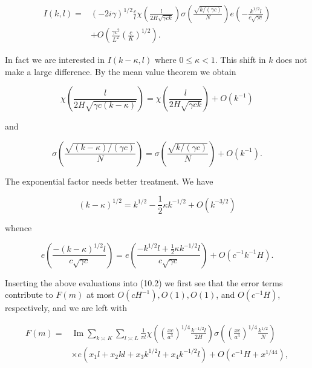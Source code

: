 \documentclass[10pt]{article}
\begin{document}
$$
\begin{aligned}
I(k,l)={}&(-2i\gamma)^{1/2}\frac{c}{l}
\chi\left(\frac{l}{2H\sqrt{\gamma ck}}\right)
\sigma\left(\frac{\sqrt{k/(\gamma c)}}{N}\right)
 e\left(-\frac{k^{1/2}l}{c\sqrt{\gamma c}}\right)\\
&+O\left(\frac{\gamma c^{2}}{L^{2}}\left(\frac{c}{K}\right)^{1/2}\right).
\end{aligned}
$$

In fact we are interested in $I(k-\kappa, l)$ where $0 \leqslant \kappa<1$. This shift in $k$ does not make a large difference. By the mean value theorem we obtain

$$
\chi\left(\frac{l}{2 H \sqrt{\gamma c(k-\kappa)}}\right)=\chi\left(\frac{l}{2 H \sqrt{\gamma c k}}\right)+O\left(k^{-1}\right)
$$

and

$$
\sigma\left(\frac{\sqrt{(k-\kappa)/(\gamma c)}}{N}\right)=\sigma\left(\frac{\sqrt{k/(\gamma c)}}{N}\right)+O\left(k^{-1}\right) .
$$

The exponential factor needs better treatment. We have

$$
(k-\kappa)^{1 / 2}=k^{1 / 2}-\frac{1}{2} \kappa k^{-1 / 2}+O\left(k^{-3 / 2}\right)
$$

whence

$$
e\left(\frac{-(k-\kappa)^{1 / 2} l}{c \sqrt{\gamma c}}\right)=e\left(\frac{-k^{1 / 2} l+\frac{1}{2} \kappa k^{-1 / 2} l}{c \sqrt{\gamma c}}\right)+O\left(c^{-1} k^{-1} H\right) .
$$

Inserting the above evaluations into (10.2) we first see that the error terms contribute to $F(m)$ at most $O\left(c H^{-1}\right), O(1), O(1)$, and $O\left(c^{-1} H\right)$, respectively, and we are left with


\begin{align*}
F(m)= & \operatorname{Im}\sum_{k\asymp K}\sum_{l\asymp L} \frac{1}{\pi l} \chi\left(\left(\frac{x c}{a^{3}}\right)^{1 / 4} \frac{k^{-1 / 2} l}{2 H}\right) \sigma\left(\left(\frac{x c}{a^{3}}\right)^{1 / 4} \frac{k^{1 / 2}}{N}\right) \\
& \times e\left(x_{1} l+x_{2} k l+x_{3} k^{1 / 2} l+x_{4} k^{-1 / 2} l\right)+O\left(c^{-1} H+x^{1 / 44}\right), \tag{12.1}
\end{align*}
\end{document}
